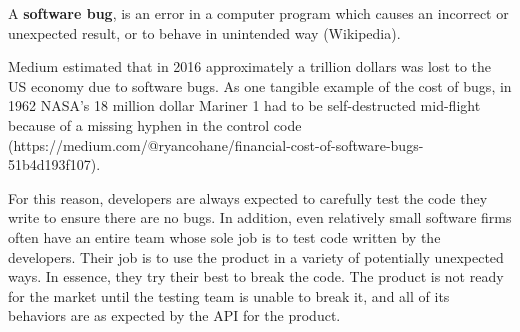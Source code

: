\begin{definition}
A \textbf{software bug}, is an error in a computer program which causes an incorrect or unexpected result, or to behave in unintended way (Wikipedia). 
\end{definition} 

Medium estimated that in 2016 approximately a trillion dollars was lost to the US economy due to software bugs. As one tangible example of the cost of bugs, in 1962 NASA's 18 million dollar Mariner 1 had to be self-destructed mid-flight because of a missing hyphen in the control code (https://medium.com/@ryancohane/financial-cost-of-software-bugs-51b4d193f107). 

For this reason, developers are always expected to carefully test the code they write to ensure there are no bugs. In addition, even relatively small software firms often have an entire team whose sole job is to test code written by the developers. Their job is to use the product in a variety of potentially unexpected ways. In essence, they try their best to break the code. The product is not ready for the market until the testing team is unable to break it, and all of its behaviors are as expected by the API for the product. 